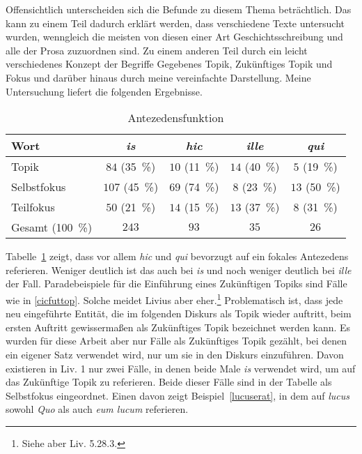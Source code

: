 \documentclass[12pt]{article}
\newcommand{\lat}[1]{\textit{#1}} %
\begin{document}
Offensichtlich unterscheiden sich die Befunde zu diesem Thema beträchtlich. Das kann zu einem Teil dadurch erklärt werden, dass verschiedene Texte untersucht wurden, wenngleich die meisten von diesen einer Art Geschichtsschreibung und alle der Prosa zuzuordnen sind.
Zu einem anderen Teil durch ein leicht verschiedenes Konzept der Begriffe Gegebenes Topik, Zukünftiges Topik und Fokus und darüber hinaus durch meine vereinfachte Darstellung.
Meine Untersuchung liefert die folgenden Ergebnisse.


\begin{table}[h]
\centering
  \begin{tabular}{l*{4}{c}}
  \toprule
	Wort & \lat{is} & \lat{hic} & \lat{ille} & \lat{qui} \\
  \midrule
	Topik & $84$ (\SI{35}{\%}) & $10$ (\SI{11}{\%}) & $14$ (\SI{40}{\%}) & $5$ (\SI{19}{\%}) \\
	Selbstfokus & $107$ (\SI{45}{\%}) & $69$ (\SI{74}{\%}) & $8$ (\SI{23}{\%}) & $13$ (\SI{50}{\%}) \\
	Teilfokus & $50$ (\SI{21}{\%}) & $14$ (\SI{15}{\%}) & $13$ (\SI{37}{\%}) & $8$ (\SI{31}{\%}) \\
	Gesamt (\SI{100}{\%}) & $243$ & $93$ & $35$ & $26$ \\
  \bottomrule
  \end{tabular}
  \caption{Antezedensfunktion}
  \label{antezedens}
\end{table}


Tabelle~\ref{antezedens} zeigt, dass vor allem \lat{hic} und \lat{qui} bevorzugt auf ein fokales Antezedens referieren. Weniger deutlich ist das auch bei \lat{is} und noch weniger deutlich bei \lat{ille} der Fall.
Paradebeispiele für die Einführung eines Zukünftigen Topiks sind Fälle wie in \ref{cicfuttop}. Solche meidet Livius aber eher.\footnote{Siehe aber Liv. 5.28.3.}
Problematisch ist, dass jede neu eingeführte Entität, die im folgenden Diskurs als Topik wieder auftritt, beim ersten Auftritt gewissermaßen als Zukünftiges Topik bezeichnet werden kann.
Es wurden für diese Arbeit aber nur Fälle als Zukünftiges Topik gezählt, bei denen ein eigener Satz verwendet wird, nur um sie in den Diskurs einzuführen.
Davon existieren in Liv. 1 nur zwei Fälle, in denen beide Male \lat{is} verwendet wird, um auf das Zukünftige Topik zu referieren. Beide dieser Fälle sind in der Tabelle als Selbstfokus eingeordnet.
Einen davon zeigt Beispiel~\ref{lucuserat}, in dem auf \lat{lucus} sowohl \lat{Quo} als auch \lat{eum lucum} referieren.
\end{document}
